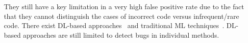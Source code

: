 They still have a key limitation in a very high false positive rate
due to the fact that they cannot distinguish the cases of incorrect
code versus infrequent/rare code.  There exist DL-based
approaches~\cite{Pradel-2018,Wang-2016b} and traditional ML
techniques~\cite{Engler-2001,Li-2005,Wasylkowski-2017,
  Wang-2016b,Wang-2016,Liang-2016}.
DL-based approaches are still limited to detect bugs in individual
methods.





